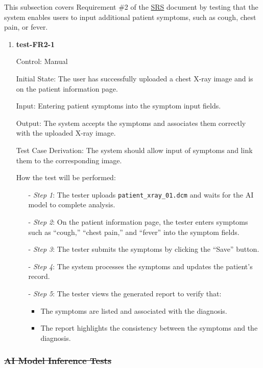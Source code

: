 \documentclass[12pt, titlepage]{article}
\begin{document}
This subsection covers Requirement \#2 of the \href{https://github.com/RezaJodeiri/CXR-Capstone/blob/main/docs/SRS/SRS.pdf}{SRS} \citep{SRS}
document by testing that the system enables users to input additional patient symptoms, such as cough, chest pain, or fever.

\begin{enumerate}

\item \textbf{test-FR2-1} \label{test-FR2-1}

Control: Manual

Initial State: The user has successfully uploaded a chest X-ray image and is on the patient information page.

Input: Entering patient symptoms into the symptom input fields.

Output: The system accepts the symptoms and associates them correctly with the uploaded X-ray image.

Test Case Derivation: The system should allow input of symptoms and link them to the corresponding image.

How the test will be performed: 
\begin{itemize}
  \item[-] \textit{Step 1}: The tester uploads \texttt{patient\_xray\_01.dcm} and waits for the AI model to complete analysis.
  \item[-] \textit{Step 2}: On the patient information page, the tester enters symptoms such as  ``cough,'' ``chest pain,'' and ``fever'' into the symptom fields.
  \item[-] \textit{Step 3}: The tester submits the symptoms by clicking the ``Save'' button.
  \item[-] \textit{Step 4}: The system processes the symptoms and updates the patient's record.
  \item[-] \textit{Step 5}: The tester views the generated report to verify that:
    \begin{itemize}
      \item The symptoms are listed and associated with the diagnosis.
      \item The report highlights the consistency between the symptoms and the diagnosis.
    \end{itemize}
  \end{itemize}

\end{enumerate}
\subsubsection{\sout{AI Model Inference Tests}}
\end{document}
